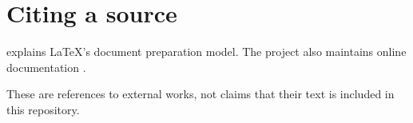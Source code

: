 \documentclass{article}
\begin{document}
\section{Citing a source}
\textcite{lamport1994} explains LaTeX's document preparation model.
The project also maintains online documentation
\parencite{latex-project}.

These are references to external works, not claims that their text
is included in this repository.
\printbibliography
\end{document}
